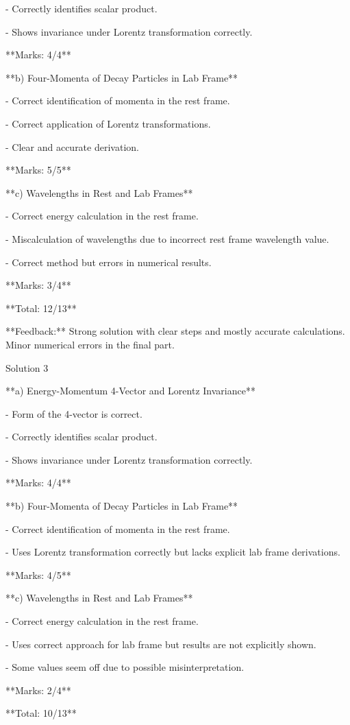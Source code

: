 \documentclass[a4paper,11pt]{article}
\begin{document}
- Correctly identifies scalar product.

- Shows invariance under Lorentz transformation correctly.

**Marks: 4/4**

**b) Four-Momenta of Decay Particles in Lab Frame**

- Correct identification of momenta in the rest frame.

- Correct application of Lorentz transformations.

- Clear and accurate derivation.

**Marks: 5/5**

**c) Wavelengths in Rest and Lab Frames**

- Correct energy calculation in the rest frame.

- Miscalculation of wavelengths due to incorrect rest frame wavelength value.

- Correct method but errors in numerical results.

**Marks: 3/4**

**Total: 12/13**

**Feedback:** Strong solution with clear steps and mostly accurate calculations. Minor numerical errors in the final part.

Solution 3

**a) Energy-Momentum 4-Vector and Lorentz Invariance**

- Form of the 4-vector is correct.

- Correctly identifies scalar product.

- Shows invariance under Lorentz transformation correctly.

**Marks: 4/4**

**b) Four-Momenta of Decay Particles in Lab Frame**

- Correct identification of momenta in the rest frame.

- Uses Lorentz transformation correctly but lacks explicit lab frame derivations.

**Marks: 4/5**

**c) Wavelengths in Rest and Lab Frames**

- Correct energy calculation in the rest frame.

- Uses correct approach for lab frame but results are not explicitly shown.

- Some values seem off due to possible misinterpretation.

**Marks: 2/4**

**Total: 10/13**
\end{document}
